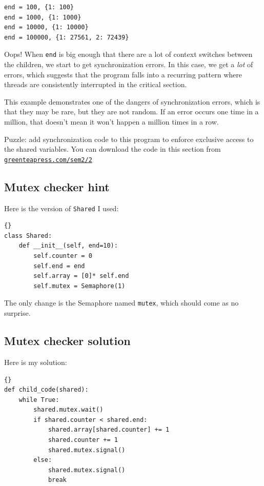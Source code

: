 \documentclass{book}
\newcommand{\shortlink}[1]{\href{https://greenteapress.com/sem2/#1}{\nolinkurl{greenteapress.com/sem2/#1}}}
\newcommand{\clearemptydoublepage}{\newpage\cleardoublepage}
\begin{document}
\begin{verbatim}
end = 100, {1: 100}
end = 1000, {1: 1000}
end = 10000, {1: 10000}
end = 100000, {1: 27561, 2: 72439}
\end{verbatim}
%
Oops!  When {\tt end} is big enough that there are a lot of
context switches between the children, we start to get synchronization
errors.  In this case, we get a {\em lot} of errors, which suggests
that the program falls into a recurring pattern where threads are 
consistently interrupted in the critical section.

This example demonstrates one of the dangers of synchronization
errors, which is that they may be rare, but they are not random.
If an error occurs one time in a million, that doesn't mean it
won't happen a million times in a row.

Puzzle: add synchronization code to this program to enforce
exclusive access to the shared variables.  You can download the
code in this section from \shortlink{2}


\clearemptydoublepage
\subsection {Mutex checker hint}

Here is the version of {\tt Shared} I used:

\begin{lstlisting}[title={}]{}
class Shared:
    def __init__(self, end=10):
        self.counter = 0
        self.end = end
        self.array = [0]* self.end
        self.mutex = Semaphore(1)
\end{lstlisting}

The only change is the Semaphore named {\tt mutex}, which should
come as no surprise.

\clearemptydoublepage
\subsection {Mutex checker solution}

Here is my solution:

\begin{lstlisting}[title={}]{}
def child_code(shared):
    while True:
        shared.mutex.wait()
        if shared.counter < shared.end:
            shared.array[shared.counter] += 1
            shared.counter += 1
            shared.mutex.signal()
        else:
            shared.mutex.signal()
            break
\end{lstlisting}
\end{document}
